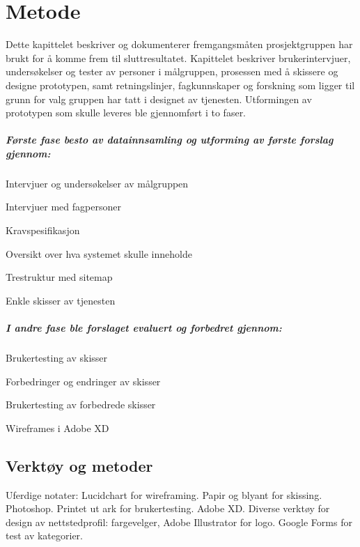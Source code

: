 \cleardoublepage
\chapter{Metode}
\label{chap:method}

Dette kapittelet beskriver og dokumenterer fremgangsmåten prosjektgruppen har brukt for å komme frem til sluttresultatet. Kapittelet beskriver brukerintervjuer, undersøkelser og tester av personer i målgruppen, prosessen med å skissere og designe prototypen, samt retningslinjer, fagkunnskaper og forskning som ligger til grunn for valg gruppen har tatt i designet av tjenesten. Utformingen av prototypen som skulle leveres ble gjennomført i to faser.

\paragraph{Første fase besto av datainnsamling og utforming av første forslag gjennom:}
\begin{compactitem}
\item Intervjuer og undersøkelser av målgruppen
\item Intervjuer med fagpersoner
\item Kravspesifikasjon
\item Oversikt over hva systemet skulle inneholde
\item Trestruktur med sitemap
\item Enkle skisser av tjenesten
\end{compactitem}

\paragraph{I andre fase ble forslaget evaluert og forbedret gjennom:}
\begin{compactitem}
\item Brukertesting av skisser
\item Forbedringer og endringer av skisser
\item Brukertesting av forbedrede skisser
\item Wireframes i Adobe XD
\end{compactitem}
\section{Verktøy og metoder}
Uferdige notater:
Lucidchart for wireframing.
Papir og blyant for skissing.
Photoshop.
Printet ut ark for brukertesting.
Adobe XD.
Diverse verktøy for design av nettstedprofil: fargevelger, Adobe Illustrator for logo.
Google Forms for test av kategorier.


